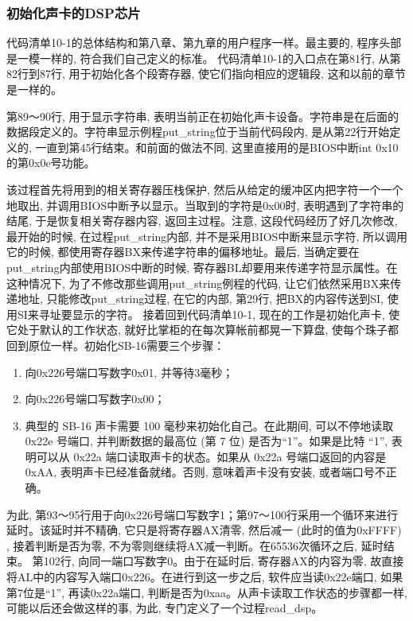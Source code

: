 \documentclass[12pt]{article}
\begin{document}
\begin{CJK}{UTF8}{gbsn}
\subsubsection{初始化声卡的DSP芯片}
代码清单10-1的总体结构和第八章、第九章的用户程序一样。最主要的, 程序头部是一模一样的, 符合我们自己定义的标准。
代码清单10-1的入口点在第81行, 从第82行到87行, 用于初始化各个段寄存器, 使它们指向相应的逻辑段, 这和以前的章节是一样的。

第89～90行, 用于显示字符串, 表明当前正在初始化声卡设备。字符串是在后面的数据段定义的。字符串显示例程put\_{}string位于当前代码段内, 是从第22行开始定义的, 一直到第45行结束。和前面的做法不同, 这里直接用的是BIOS中断int 0x10的第0x0e号功能。

该过程首先将用到的相关寄存器压栈保护, 然后从给定的缓冲区内把字符一个一个地取出, 并调用BIOS中断予以显示。当取到的字符是0x00时, 表明遇到了字符串的结尾, 于是恢复相关寄存器内容, 返回主过程。注意, 这段代码经历了好几次修改, 最开始的时候, 在过程put\_{}string内部, 并不是采用BIOS中断来显示字符, 所以调用它的时候, 都使用寄存器BX来传递字符串的偏移地址。最后, 当确定要在put\_{}string内部使用BIOS中断的时候, 寄存器BL却要用来传递字符显示属性。在这种情况下, 为了不修改那些调用put\_{}string例程的代码, 让它们依然采用BX来传递地址, 只能修改put\_{}string过程, 在它的内部, 第29行, 把BX的内容传送到SI, 使用SI来寻址要显示的字符。
接着回到代码清单10-1, 现在的工作是初始化声卡, 使它处于默认的工作状态, 就好比掌柜的在每次算帐前都晃一下算盘, 使每个珠子都回到原位一样。初始化SB-16需要三个步骤：
\begin{enumerate}
\item 向0x226号端口写数字0x01, 并等待3毫秒；
\item 向0x226号端口写数字0x00；
\item 典型的 SB-16 声卡需要 100 毫秒来初始化自己。在此期间, 可以不停地读取
0x22e 号端口, 并判断数据的最高位 (第 7 位) 是否为``1''。如果是比特 ``1'', 表明可以从
0x22a 端口读取声卡的状态。如果从 0x22a 号端口返回的内容是 0xAA, 表明声卡已经准备就绪。否则,
意味着声卡没有安装, 或者端口号不正确。
\end{enumerate}
为此, 第93～95行用于向0x226号端口写数字1；第97～100行采用一个循环来进行延时。该延时并不精确, 它只是将寄存器AX清零, 然后减一 (此时的值为0xFFFF) , 接着判断是否为零, 不为零则继续将AX减一判断。在65536次循环之后, 延时结束。
第102行, 向同一端口写数字0。由于在延时后, 寄存器AX的内容为零, 故直接将AL中的内容写入端口0x226。在进行到这一步之后, 软件应当读0x22e端口, 如果第7位是“1”, 再读0x22a端口, 判断是否为0xaa。从声卡读取工作状态的步骤都一样, 可能以后还会做这样的事, 为此, 专门定义了一个过程read\_{}dsp。


\end{CJK}
\end{document}
